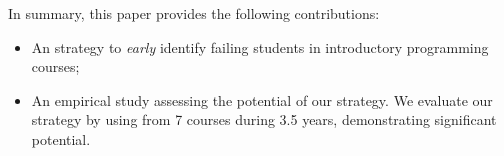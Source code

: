 In summary, this paper provides the following contributions:

\begin{itemize}

	\item An strategy to \textit{early} identify failing students in introductory programming courses;
	
	\item An empirical study assessing the potential of our strategy. We evaluate our strategy by using \totalStudents from 7 courses during 3.5 years, demonstrating significant potential.

\end{itemize}